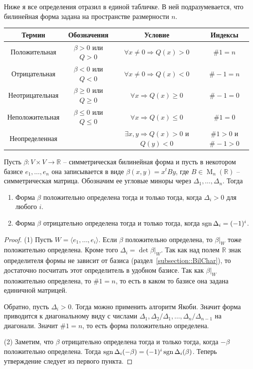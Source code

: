 Ниже я все определения отразил в единой табличке. В ней подразумевается, что билинейная форма задана на пространстве размерности $n$. 
\begin{center}
\begin{tabular}{|c|c|c|c|}
\hline
{\bf Термин}&{\bf Обозначения}&{\bf Условие}&{\bf Индексы}\\
\hline
{Положительная}&{$\beta>0$ или $Q>0$}&{$\forall x\neq 0\Rightarrow Q(x) > 0$}&{$\# 1 = n$}\\
\hline
{Отрицательная}&{$\beta<0$ или $Q<0$}&{$\forall x\neq 0\Rightarrow Q(x) < 0$}&{$\#-1 = n$}\\
\hline
{Неотрицательная}&{$\beta\geqslant0$ или $Q\geqslant0$}&{$\forall x\Rightarrow Q(x) \geqslant 0$}&{$\#-1 = 0$}\\
\hline
{Неположительная}&{$\beta\leqslant0$ или $Q\leqslant0$}&{$\forall x\Rightarrow Q(x) \leqslant 0$}&{$\#1 = 0$}\\
\hline
{Неопределенная}&{}&{$\exists x, y\Rightarrow Q(x) > 0$ и $Q(y)<0$}&{$\#1>0$ и $\#-1>0$}\\
\hline
\end{tabular}
\end{center}

\begin{claim}\label{claim::SilvCrit}
Пусть $\beta\colon V\times V\to \mathbb R$ -- симметрическая билинейная форма и пусть в некотором базисе $e_1,\ldots,e_n$ она записывается в виде $\beta(x, y) = x^t B y$, где $B\in \operatorname{M}_n(\mathbb R)$ -- симметрическая матрица. Обозначим ее угловые миноры через $\Delta_1,\ldots,\Delta_n$. Тогда
\begin{enumerate}
\item Форма $\beta$ положительно определена тогда и только тогда, когда $\Delta_i > 0$ для любого $i$.

\item Форма $\beta$ отрицательно определена тогда и только тогда, когда $\operatorname{sgn} \Delta_i = (-1)^i$.
\end{enumerate}
\end{claim}
\begin{proof}
(1) Пусть $W = \langle e_1,\ldots,e_i\rangle$. Если $\beta$ положительно определена, то $\beta|_W$ тоже положительно определена. Кроме того $\Delta_i = \det \beta|_W$. Так как над полем $\mathbb R$ знак определителя формы не зависит от базиса (раздел~\ref{subsection::BilChar}), то достаточно посчитать этот определитель в удобном базисе. Так как $\beta|_W$ положительно определена, то $\#1 = n$, то есть в каком то базисе она задана единичной матрицей. 

Обратно, пусть $\Delta_i > 0$. Тогда можно применить алгоритм Якоби. Значит форма приводится к диагональному виду с числами $\Delta_1, \Delta_2/\Delta_1,\ldots,\Delta_n/\Delta_{n-1}$ на диагонали. Значит $\#1 = n$, то есть форма положительно определена.

(2) Заметим, что $\beta$ отрицательно определена тогда и только тогда, когда $-\beta$ положительно определена. Тогда $\operatorname{sgn}\Delta_i(-\beta) = (-1)^i\operatorname{sgn}\Delta_i(\beta)$. Теперь утверждение следует из первого пункта.
\end{proof}

